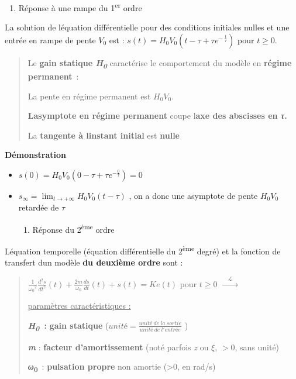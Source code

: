 \begin{enumerate}
\def\labelenumi{\arabic{enumi}.}
\item
  \protect\hypertarget{mod-_Toc99121102}{}{}Réponse à une rampe du 1\textsuperscript{er} ordre
\end{enumerate}

La solution de l\textquotesingle équation différentielle pour des conditions initiales nulles et une entrée en rampe de pente \(V_{0}\) est : \(s(t) = H_{0}V_{0}\left( t - \tau + \tau e^{- \ \frac{t}{\tau}} \right)\) pour \(t \geq 0\).

\begin{quote}
Le \textbf{gain statique \emph{H\textsubscript{0}}} caractérise le comportement du modèle en \textbf{régime permanent}~:

La pente en régime permanent est \(H_{0}V_{0}\).

\textbf{L\textquotesingle asymptote en régime permanent} coupe l\textquotesingle{}\textbf{axe des abscisses en \emph{τ}.}

La \textbf{tangente à l\textquotesingle instant initial} est \textbf{nulle}
\end{quote}

\textbf{Démonstration}

\begin{itemize}
\item
  \(s(0) = H_{0}V_{0}\left( 0 - \tau + \tau e^{- \frac{0}{\tau}} \right) = 0\)
\item
  \(s_{\infty} = \lim_{t \rightarrow + \infty}{H_{0}V_{0}(t - \tau)}\) , on a donc une asymptote de pente \(H_{0}V_{0}\) retardée de \(\tau\)

  \begin{enumerate}
  \def\labelenumi{\arabic{enumi}.}
  \item
    \protect\hypertarget{mod-_Toc99121103}{}{}Réponse du 2\textsuperscript{ème} ordre
  \end{enumerate}
\end{itemize}

L\textquotesingle équation temporelle (équation différentielle du 2\textsuperscript{ème} degré) et la fonction de transfert d\textquotesingle un modèle \textbf{du deuxième ordre} sont :

\begin{quote}
\(\frac{1}{{\omega_{0}}^{2}}\frac{d^{2}s}{{dt}^{2}}(t) + \frac{2m}{\omega_{0}}\frac{ds}{dt}(t) + s(t) = Ke(t)\) pour \(t \geq 0\) \(\overset{\quad\mathcal{L}\quad}{\rightarrow}\)

\ul{paramètres caractéristiques :}

\textbf{\emph{H\textsubscript{0}~}:} \textbf{gain statique} (\(unité = \frac{unité\ de\ la\ sortie}{unité\ de\ l'entrée}\) )

\emph{\textbf{m}} : \textbf{facteur d'amortissement} (noté parfois \emph{z} ou \(\xi\), \(> 0\), sans unité)

\textbf{\emph{ω}\textsubscript{0}}~: \textbf{pulsation propre} non amortie (\textgreater0, en rad/s)
\end{quote}

